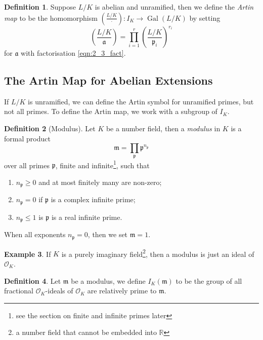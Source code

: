 \documentclass[11pt]{article}
\theoremstyle{definition}
\newtheorem{definition}{Definition}[section]
\newtheorem{example}[definition]{Example}
\theoremstyle{plain}
\theoremstyle{remark}
\DeclareMathOperator{\Gal}{Gal}
\newcommand{\RR}{\mathbb{R}}
\newcommand{\cO}{\mathcal{O}}
\newcommand{\fa}{\mathfrak{a}}
\newcommand{\fp}{\mathfrak{p}}
\newcommand{\fm}{\mathfrak{m}}
\newcommand{\leg}[2]{\left(\frac{#1}{#2}\right)}
\begin{document}
\begin{definition}\label{def:2_4}
    Suppose $L/K$ is abelian and unramified, then we define the \emph{Artin map} to be the homomorphism $\leg{L/K}{\cdot} : I_K \to \Gal(L/K)$ by setting
    \begin{equation}\label{eqn:2_4_star}
        \leg{L/K}{\fa} = \prod_{i=1}^r \leg{L/K}{\fp_i}^{r_i}
    \end{equation}
    for $\fa$ with factorisation \eqref{eqn:2_3_fact}.
\end{definition}

\subsection{The Artin Map for Abelian Extensions}

If $L/K$ is unramified, we can define the Artin symbol for unramified primes, but not all primes. To define the Artin map, we work with a subgroup of $I_K$.

\begin{definition}[Modulus]\label{def:2_5}
    Let $K$ be a number field, then a \emph{modulus} in $K$ is a formal product
    \begin{equation*}
        \fm = \prod_\fp \fp^{n_\fp}
    \end{equation*}
    over all primes $\fp$, finite and infinite\footnote{see the section on finite and infinite primes later}, such that
    \begin{enumerate}
        \item $n_\fp \ge 0$ and at most finitely many are non-zero;
        \item $n_\fp = 0$ if $\fp$ is a complex infinite prime;
        \item $n_\fp \le 1$ is $\fp$ is a real infinite prime.
    \end{enumerate}
    When all exponents $n_\fp = 0$, then we set $\fm = 1$.
\end{definition}

\begin{example}\label{eg:2_6}
    If $K$ is a purely imaginary field\footnote{a number field that cannot be embedded into $\RR$}, then a modulus is just an ideal of $\cO_K$.
\end{example}

\begin{definition}\label{def:2_7}
    Let $\fm$ be a modulus, we define $I_K(\fm)$ to be the group of all fractional $\cO_K$-ideals of $\cO_K$ are relatively prime to $\fm$.
\end{definition}
\end{document}
